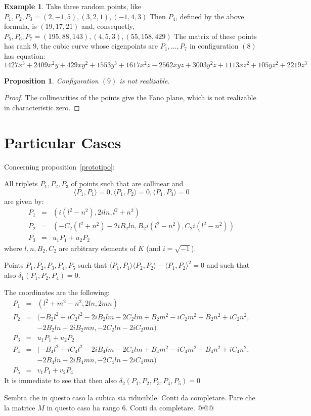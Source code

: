 \documentclass{amsart}
\theoremstyle{plain}
\newtheorem{prop}[theorem]{Proposition}
\theoremstyle{definition}
\newtheorem{example}[theorem]{Example}
\newcommand{\scl}[2]{\langle #1, #2 \rangle}
\begin{document}
\begin{example}
  Take three random points, like
  $P_1, P_2, P_3 = (2, -1, 5), (3, 2, 1), (-1, 4, 3)$
  Then $P_4$, defined by the above formula, is $(19, 17, 21)$
  and, consequetly, $P_5, P_6, P_7 = (195, 88, 143), (4, 5, 3), (55, 158, 429)$
  The matrix of these points has rank $9$, the cubic curve whose
  eigenpoints are $P_1, \dots, P_7$ in configuration $(8)$ has equation:
  \[
1427x^3 + 2409x^2y + 429xy^2 + 1553y^3 + 1617x^2z - 2562xyz + 3003y^2z + 1113xz^2 + 105yz^2 + 2219z^3
  \]
\end{example}
\begin{prop} Configuration $(9)$ is not realizable.
\end{prop}
\begin{proof}
  The collinearities of the points give the Fano plane, which is not
  realizable in characteristic zero.
\end{proof}

\section{Particular Cases}
Concerning proposition~\ref{prototipo}:

All triplets $P_1, P_2, P_3$ of points such that are collinear and
\[\scl{P_1}{P_1} = 0, \scl{P_1}{P_2} = 0, \scl{P_1}{P_3} = 0
\]
are given by:
\begin{eqnarray*}
P_1 &=& (i(l^2-n^2), 2iln, l^2+n^2) \\
P_2 &=& (-C_2(l^2+n^2) - 2iB_2ln, B_2i(l^2-n^2), C_2i(l^2-n^2))\\
P_3 &=& u_1P_1+u_2P_2
\end{eqnarray*}
where $l, n, B_2, C_2$ are arbitrary elements of $K$ (and $i=\sqrt{-1}$).

\bigskip
Points $P_1, P_2, P_3, P_4, P_5$ such that 
$\scl{P_1}{P_1}\scl{P_2}{P_2}-\scl{P_1}{P_2}^2 = 0$ and such that also
$\delta_1(P_1, P_2, P_4)=0$.

The coordinates are the following:
\begin{eqnarray*}
  P_1 &=& (l^2+m^2-n^2, 2ln, 2mn)\\
  P_2 &=& (-B_2l^2 + iC_2l^2 -2iB_2lm-2C_2lm + B_2m^2-iC_2m^2 + B_2n^2 + iC_2n^2,\\
  & & -2B_2ln -2iB_2mn, -2C_2ln -2iC_2mn)\\
  P_3 &=& u_1P_1+u_2P_2\\
  P_4 &=& (-B_4l^2 + iC_4l^2 -2iB_4lm-2C_4lm + B_4m^2 -iC_4m^2+B_4n^2 + iC_4n^2,\\
  & & -2B_4ln -2iB_4mn, -2C_4ln -2iC_4mn)\\
  P_5 &=& v_1P_1+v_2P_4
\end{eqnarray*}
It is immediate to see that then also $\delta_2(P_1, P_2, P_3, P_4, P_5) = 0$

Sembra che in questo caso la cubica sia riducibile. Conti da completare.
Pare che la matrice $M$ in questo caso ha rango $6$. Conti da completare.
@@@




\end{document}
